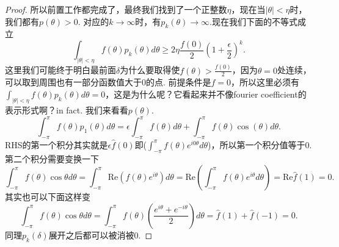 \documentclass{article}
\begin{document}
\begin{proof}
所以前置工作都完成了，最终我们找到了一个正整数$\eta$，现在当$|\theta| < \eta$时，我们都有$p(\theta)>0$. 对应的$k \rightarrow \infty$时，有$p_k(\theta) \rightarrow \infty.$现在我们下面的不等式成立
$$
\int_{|\theta| < \eta} f(\theta)p_k(\theta)d\theta \geq 2\eta\frac{f(0)}{2}(1+\frac{\epsilon}{2})^k.
$$
这里我们可能终于明白最前面$\delta$为什么要取得使$f(\theta) > \frac{f(0)}{2}$，因为$\theta=0$处连续，可以取到周围也有一部分函数值大于$0$的点. 前提条件是$\widehat{f}=0$，所以这里必须有$\int_{|\theta| < \eta} f(\theta)p_k(\theta)d\theta = 0$，这是为什么呢？它看起来并不像fourier coefficient的表示形式啊？in fact. 我们来看看$p(\theta)$.
$$
\int_{-\pi}^\pi f(\theta)p_1(\theta) d\theta = \epsilon\int_{-\pi}^\pi f(\theta) d\theta + \int_{-\pi}^\pi f(\theta)\cos(\theta) d\theta .
$$
RHS的第一个积分其实就是$\epsilon \widehat{f}(0)$即($\int_{-\pi}^\pi f(\theta)e^{i0\theta} d\theta$)，所以第一个积分值等于$0$. 第二个积分需要变换一下
$$
\int_{-\pi}^\pi f(\theta)\cos\theta d\theta = \int_{-\pi}^\pi \text{Re}(f(\theta)e^{i\theta} )d\theta = \text{Re}\left(\int_{-\pi}^\pi f(\theta)e^{i\theta} d\theta\right) = \text{Re}\hat{f}(1) = 0.
$$
其实也可以下面这样变
$$
\int_{-\pi}^\pi f(\theta)\cos\theta d\theta = \int_{-\pi}^\pi f(\theta)(\frac{e^{i\theta}+e^{-i\theta}}{2})d\theta = \widehat{f}(1) + \widehat{f}(-1) = 0.
$$
同理$p_k(\delta)$展开之后都可以被消被0. 






\end{proof}
\end{document}
